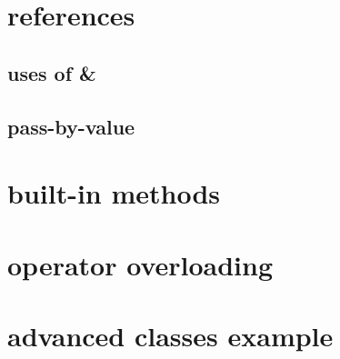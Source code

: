 

\section{references}

%



\subsection{uses of \&}



\subsection{pass-by-value}




\section{built-in methods}



\section{operator overloading}



\section{advanced classes example}


